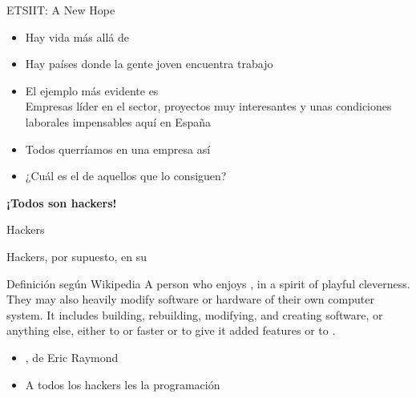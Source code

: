 \documentclass[14pt]{beamer}
\newcommand{\WebLink}[2]{
  \href{#1}{\structure{\PointingHand~\color{sail-green}{#2}}}
}
\begin{document}
\begin{frame}{ETSIIT: A New Hope}
  \begin{itemize}
    \item Hay vida más allá de 
    \item Hay países donde la gente joven encuentra trabajo
    \item El ejemplo más evidente es  \\
      {\small Empresas líder en el sector, proyectos muy interesantes
        y unas condiciones laborales impensables aquí en España}
    \item Todos querríamos  en una empresa así
    \item ¿Cuál es el  de aquellos que lo consiguen?
  \end{itemize}
  \begin{center} \Large \bf ¡Todos son hackers!\end{center}
\end{frame}


\begin{frame}{Hackers}
    \begin{center}
      Hackers, por supuesto, en su 
    \end{center}

    \begin{block}{\footnotesize Definición según Wikipedia}
      \centering \footnotesize A person who enjoys , in a spirit of playful
      cleverness. They may also heavily modify software or hardware of
      their own computer system. It includes building, rebuilding,
      modifying, and creating software, or anything else, either to
       or faster or to give it added
      features or to .
    \end{block}

  \begin{itemize}
    \item \WebLink{http://www.catb.org/esr/faqs/hacker-howto.html}
                  {How To Become A Hacker}, de Eric Raymond
    \item A todos los hackers les  la programación
  \end{itemize}
\end{frame}
\end{document}
